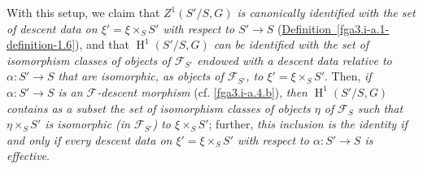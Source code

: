   With this setup, we claim that \emph{\(Z^1(S'/S,G)\) is canonically identified with the set of descent data on \(\xi '=\xi \times _S S'\) with respect to \(S'\to  S\)} (\hyperref[fga3.i-a.1-definition-1.6]{Definition~\ref*{fga3.i-a.1-definition-1.6}}), and that \emph{\(\operatorname {H}^1(S'/S,G)\) can be identified with the set of isomorphism classes of objects of \(\mathcal {F}_{S'}\) endowed with a descent data relative to \(\alpha \colon  S'\to  S\) that are isomorphic, as objects of \(\mathcal {F}_{S'}\), to \(\xi '=\xi \times _S S'\)}.
  Then, \emph{if \(\alpha \colon  S'\to  S\) is an \(\mathcal {F}\)-descent morphism} (cf. \cref{fga3.i-a.4.b}), \emph{then \(\operatorname {H}^1(S'/S,G)\) contains as a subset the set of isomorphism classes of objects \(\eta \) of \(\mathcal {F}_S\) such that \(\eta \times _S S'\) is isomorphic (in \(\mathcal {F}_{S'}\)) to \(\xi \times _S S'\)};
  further, \emph{this inclusion is the identity if and only if every descent data on \(\xi '=\xi \times _S S'\) with respect to \(\alpha \colon  S'\to  S\) is effective}.

